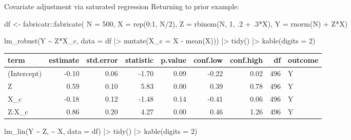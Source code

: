 \documentclass[
  11pt,
  ignorenonframetext,
]{beamer}
\newenvironment{Shaded}{\begin{snugshade}}{\end{snugshade}}
\newcommand{\AttributeTok}[1]{\textcolor[rgb]{0.40,0.45,0.13}{#1}}
\newcommand{\DecValTok}[1]{\textcolor[rgb]{0.68,0.00,0.00}{#1}}
\newcommand{\FunctionTok}[1]{\textcolor[rgb]{0.28,0.35,0.67}{#1}}
\newcommand{\NormalTok}[1]{\textcolor[rgb]{0.00,0.23,0.31}{#1}}
\newcommand{\OtherTok}[1]{\textcolor[rgb]{0.00,0.23,0.31}{#1}}
\newcommand{\SpecialCharTok}[1]{\textcolor[rgb]{0.37,0.37,0.37}{#1}}
\begin{document}
\begin{frame}[fragile]{Covariate adjustment via saturated regression}
\protect\hypertarget{covariate-adjustment-via-saturated-regression-1}{}
Returning to prior example:

\begin{Shaded}
\begin{Highlighting}[]
\NormalTok{df }\OtherTok{\textless{}{-}}\NormalTok{ fabricatr}\SpecialCharTok{::}\FunctionTok{fabricate}\NormalTok{(}
  \AttributeTok{N =} \DecValTok{500}\NormalTok{, }
  \AttributeTok{X =} \FunctionTok{rep}\NormalTok{(}\DecValTok{0}\SpecialCharTok{:}\DecValTok{1}\NormalTok{, N}\SpecialCharTok{/}\DecValTok{2}\NormalTok{), }
  \AttributeTok{Z =} \FunctionTok{rbinom}\NormalTok{(N, }\DecValTok{1}\NormalTok{, .}\DecValTok{2} \SpecialCharTok{+}\NormalTok{ .}\DecValTok{3}\SpecialCharTok{*}\NormalTok{X),}
  \AttributeTok{Y =} \FunctionTok{rnorm}\NormalTok{(N) }\SpecialCharTok{+}\NormalTok{ Z}\SpecialCharTok{*}\NormalTok{X)}

\FunctionTok{lm\_robust}\NormalTok{(Y }\SpecialCharTok{\textasciitilde{}}\NormalTok{ Z}\SpecialCharTok{*}\NormalTok{X\_c, }\AttributeTok{data =}\NormalTok{ df }\SpecialCharTok{|\textgreater{}} \FunctionTok{mutate}\NormalTok{(}\AttributeTok{X\_c =}\NormalTok{ X }\SpecialCharTok{{-}} \FunctionTok{mean}\NormalTok{(X))) }\SpecialCharTok{|\textgreater{}}
  \FunctionTok{tidy}\NormalTok{() }\SpecialCharTok{|\textgreater{}} \FunctionTok{kable}\NormalTok{(}\AttributeTok{digits =} \DecValTok{2}\NormalTok{)}
\end{Highlighting}
\end{Shaded}

\begin{tabular}{l|r|r|r|r|r|r|r|l}
\hline
term & estimate & std.error & statistic & p.value & conf.low & conf.high & df & outcome\\
\hline
(Intercept) & -0.10 & 0.06 & -1.70 & 0.09 & -0.22 & 0.02 & 496 & Y\\
\hline
Z & 0.59 & 0.10 & 5.83 & 0.00 & 0.39 & 0.78 & 496 & Y\\
\hline
X\_c & -0.18 & 0.12 & -1.48 & 0.14 & -0.41 & 0.06 & 496 & Y\\
\hline
Z:X\_c & 0.86 & 0.20 & 4.27 & 0.00 & 0.46 & 1.26 & 496 & Y\\
\hline
\end{tabular}

\begin{Shaded}
\begin{Highlighting}[]
\FunctionTok{lm\_lin}\NormalTok{(Y }\SpecialCharTok{\textasciitilde{}}\NormalTok{ Z, }\SpecialCharTok{\textasciitilde{}}\NormalTok{ X, }\AttributeTok{data =}\NormalTok{ df) }\SpecialCharTok{|\textgreater{}}
  \FunctionTok{tidy}\NormalTok{() }\SpecialCharTok{|\textgreater{}} \FunctionTok{kable}\NormalTok{(}\AttributeTok{digits =} \DecValTok{2}\NormalTok{)}
\end{Highlighting}
\end{Shaded}


\end{frame}
\end{document}
